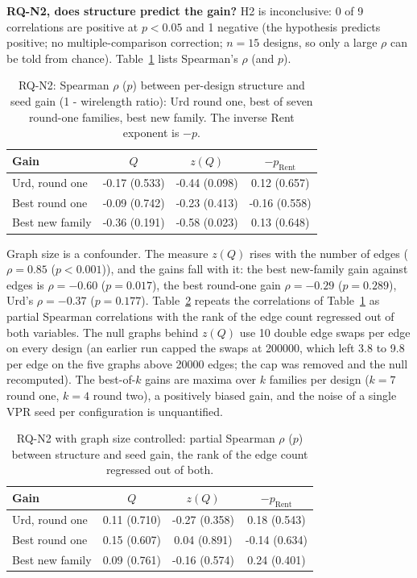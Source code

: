 \textbf{RQ-N2, does structure predict the gain?} H2 is inconclusive: 0 of
9 correlations are positive at $p<0.05$ and 1 negative (the hypothesis predicts positive; no multiple-comparison correction; $n=15$ designs, so only a
large $\rho$ can be told from chance). Table~\ref{tab:r2n2} lists Spearman's $\rho$ (and $p$).

\begin{table}[t]
\caption{RQ-N2: Spearman $\rho$ ($p$) between per-design structure and seed gain
(1 - wirelength ratio): Urd round one, best of seven round-one families, best new family. The
inverse Rent exponent is $-p$.}
\label{tab:r2n2}
\centering
\footnotesize\setlength{\tabcolsep}{3pt}
\begin{tabular}{lccc}
\toprule
Gain & $Q$ & $z(Q)$ & $-p_{\text{Rent}}$ \\
\midrule
Urd, round one & -0.17 (0.533) & -0.44 (0.098) & 0.12 (0.657) \\
Best round one & -0.09 (0.742) & -0.23 (0.413) & -0.16 (0.558) \\
Best new family & -0.36 (0.191) & -0.58 (0.023) & 0.13 (0.648) \\
\bottomrule
\end{tabular}
\end{table}

Graph size is a confounder. The measure $z(Q)$ rises with the number of edges ($\rho=0.85$ ($p<0.001$)), and the gains fall with it: the best
new-family gain against edges is $\rho=-0.60$ ($p=0.017$), the best round-one gain $\rho=-0.29$ ($p=0.289$), Urd's $\rho=-0.37$ ($p=0.177$). Table~\ref{tab:r2n2p}
repeats the correlations of Table~\ref{tab:r2n2} as partial Spearman correlations with the rank of the edge count regressed out of both
variables. The null graphs behind $z(Q)$ use 10 double edge swaps per edge on every design (an earlier run capped the swaps at 200000, which left
3.8 to 9.8 per edge on the five graphs above 20000 edges; the cap was removed and the null recomputed). The best-of-$k$ gains are maxima over $k$
families per design ($k=7$ round one, $k=4$ round two), a positively biased gain, and the noise of a single VPR seed per configuration is unquantified.

\begin{table}[t]
\caption{RQ-N2 with graph size controlled: partial Spearman $\rho$ ($p$) between structure and seed gain, the rank of the edge count
regressed out of both.}
\label{tab:r2n2p}
\centering
\footnotesize\setlength{\tabcolsep}{3pt}
\begin{tabular}{lccc}
\toprule
Gain & $Q$ & $z(Q)$ & $-p_{\text{Rent}}$ \\
\midrule
Urd, round one & 0.11 (0.710) & -0.27 (0.358) & 0.18 (0.543) \\
Best round one & 0.15 (0.607) & 0.04 (0.891) & -0.14 (0.634) \\
Best new family & 0.09 (0.761) & -0.16 (0.574) & 0.24 (0.401) \\
\bottomrule
\end{tabular}
\end{table}
